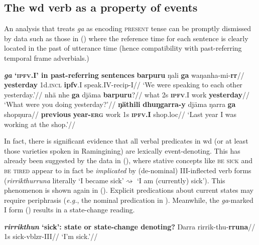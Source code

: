 \subsection{The \acrshort{wd} verb as a property of events}\label{sec:djr-stems}

An analysis that treats \textit{ga} as encoding \textsc{present} tense can be promptly dismissed by data such as those in (\nextx) where the reference time for each sentence is clearly located in the past of utterance time (hence compatibility with past-referring temporal frame adverbials.)

\pex \textbf{\textit{ga} `\textsc{ipfv}.\gls{I}' in past-referring sentences}
\a\begingl\gla \textbf{barpuru} ŋali \textbf{ga} waŋanha-mi-\textbf{rr}//
\glb \textbf{yesterday} 1d.\textsc{incl} \textbf{\gls{ipfv}}.\gls{I} speak.\gls{IV}-\gls{recip}-\gls{I}//
\glft`We were speaking to each other yesterday.'\trailingcitation{[AW~20190426]}//\endgl
\a\begingl\gla nhä nhe \textbf{ga} djäma \textbf{barpuru}?//
\glb what 2s \textsc{\textbf{ipfv}}.\gls{I} work \textbf{yesterday}//
\glft`What were you doing yesterday?'\trailingcitation{[DhG 20190413]}//\endgl
\a\begingl\gla \textbf{ŋäthili} \textbf{dhuŋgarra-y} djäma ŋarra \textbf{ga} shopŋura//
\glb \textbf{previous} \textbf{year-\textsc{erg}} work 1s \textsc{\textbf{ipfv.\gls{I}}} shop.\gls{loc}//
\glft`Last year I was working at the shop.'\trailingcitation{[DB~20190416]}//\endgl
\xe

In fact, there is significant evidence that all verbal predicates in \gls{wd} (or at least those varieties spoken in Ramingining) are lexically event-denoting. This has already been suggested by the data in (), where stative concepts like \textsc{be sick} and \textsc{be tired} appear to in fact be \textit{implicated} by (de-nominal) \gls{III}-inflected verb forms (\textit{rirrikthurruna} literally `I became sick'$ \rightsquigarrow $ `I am (currently) sick'). This phenomenon is shown again in (). Explicit predications about current states may require periphrasis (\textit{e.g.}, the nominal predication in ). Meanwhile, the \textit{ga}-marked \gls{I} form () results in a state-change reading.

\pex\textbf{\textit{rirrikthun} `sick': state or state-change denoting?}
\a{}\begingl\gla Ŋarra rirrik-thu-\textbf{rruna}//
\glb 1s sick-\gls{vblzr}-\gls{III}//
\glft`I'm sick.'\trailingcitation[DB~20190405]//\endgl

